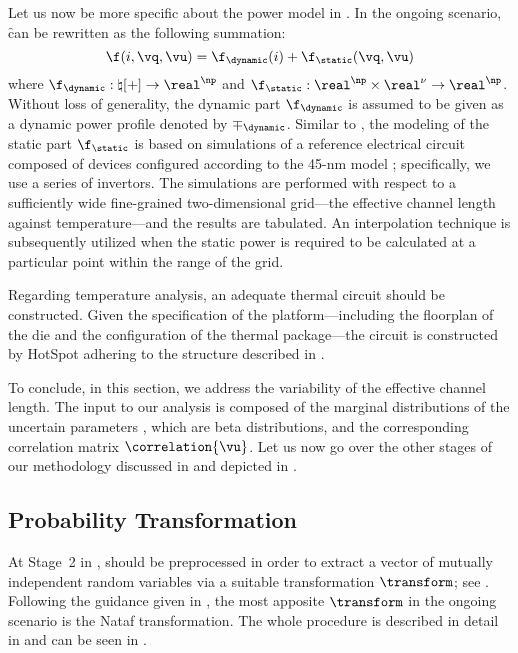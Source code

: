 Let us now be more specific about the power model in .
In the ongoing scenario, \f can be rewritten as the following summation:
\[
  \f(i, \vq, \vu) = \f_\dynamic(i) + \f_\static(\vq, \vu)
\]
where $\f_\dynamic: \natural[+] \to \real^\np$ and $\f_\static: \real^\np \times
\real^\nu \to \real^\np$. Without loss of generality, the dynamic part
$\f_\dynamic$ is assumed to be given as a dynamic power profile denoted by
$\mp_\dynamic$. Similar to , the modeling of the static part
$\f_\static$ is based on  simulations of a reference electrical
circuit composed of  devices \cite{bsim} configured according to the
45-nm   model \cite{ptm}; specifically, we use a series of
 invertors. The simulations are performed with respect to a
sufficiently wide fine-grained two-dimensional grid---the effective channel
length against temperature---and the results are tabulated. An interpolation
technique is subsequently utilized when the static power is required to be
calculated at a particular point within the range of the grid.

Regarding temperature analysis, an adequate thermal  circuit should be
constructed. Given the specification of the platform---including the floorplan
of the die and the configuration of the thermal package---the circuit is
constructed by HotSpot \cite{skadron2003} adhering to the structure described in
.

To conclude, in this section, we address the variability of the effective
channel length. The input to our analysis is composed of the marginal
distributions of the uncertain parameters \vu, which are beta distributions, and
the corresponding correlation matrix $\correlation{\vu}$. Let us now go over the
other stages of our methodology discussed in 
and depicted in .

\subsection{Probability Transformation}

At Stage~2 in , \vu should be preprocessed in order to
extract a vector of mutually independent random variables \vz via a suitable
transformation $\transform$; see . Following the
guidance given in , the most apposite $\transform$ in
the ongoing scenario is the Nataf transformation. The whole procedure is
described in detail in  and can be seen in
.

